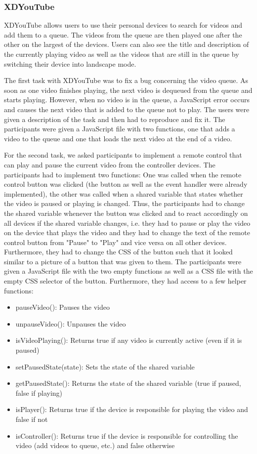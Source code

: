 \subsubsection{XDYouTube}
XDYouTube allows users to use their personal devices to search for videos and add them to a queue. The videos from the queue are then played one after the other on the largest of the devices. Users can also see the title and description of the currently playing video as well as the videos that are still in the queue by switching their device into landscape mode.

The first task with XDYouTube was to fix a bug concerning the video queue. As soon as one video finishes playing, the next video is dequeued from the queue and starts playing. However, when no video is in the queue, a JavaScript error occurs and causes the next video that is added to the queue not to play. The users were given a description of the task and then had to reproduce and fix it.  The participants were given a JavaScript file with two functions, one that adds a video to the queue and one that loads the next video at the end of a video.

For the second task, we asked participants to implement a remote control that can play and pause the current video from the controller devices. The participants had to implement two functions: One was called when the remote control button was clicked (the button as well as the event handler were already implemented), the other was called when a shared variable that states whether the video is paused or playing is changed. Thus, the participants had to change the shared variable whenever the button was clicked and to react accordingly on all devices if the shared variable changes, i.e. they had to pause or play the video on the device that plays the video and they had to change the text of the remote control button from "Pause" to "Play" and vice versa on all other devices. Furthermore, they had to change the CSS of the button such that it looked similar to a picture of a button that was given to them. The participants were given a JavaScript file with the two empty functions as well as a CSS file with the empty CSS selector of the button. Furthermore, they had access to a few helper functions:
\begin{itemize}
	\item pauseVideo(): Pauses the video
	\item unpauseVideo(): Unpauses the video
	\item isVideoPlaying(): Returns true if any video is currently active (even if it is paused)
	\item setPausedState(state): Sets the state of the shared variable
	\item getPausedState(): Returns the state of the shared variable (true if paused, false if playing)
	\item isPlayer(): Returns true if the device is responsible for playing the video and false if not
	\item isController(): Returns true if the device is responsible for controlling the video (add videos to queue, etc.) and false otherwise
\end{itemize}

